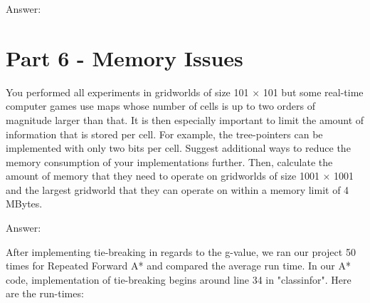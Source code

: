 \documentclass{article}
\begin{document}

Answer: \newline

\par 


\section{Part 6 - Memory Issues}

You performed all experiments in gridworlds of size 101 × 101 but some real-time
computer games use maps whose number of cells is up to two orders of magnitude larger than that. It is then especially
important to limit the amount of information that is stored per cell. For example, the tree-pointers can be implemented with
only two bits per cell. Suggest additional ways to reduce the memory consumption of your implementations further. Then,
calculate the amount of memory that they need to operate on gridworlds of size 1001 × 1001 and the largest gridworld that
they can operate on within a memory limit of 4 MBytes.
\newline


Answer: \newline
\par After implementing tie-breaking in regards to the g-value, we ran our project 50 times for Repeated Forward A* and compared the average run time. In our A* code, implementation of tie-breaking begins around line 34 in "classinfor".
Here are the run-times:
\end{document}
